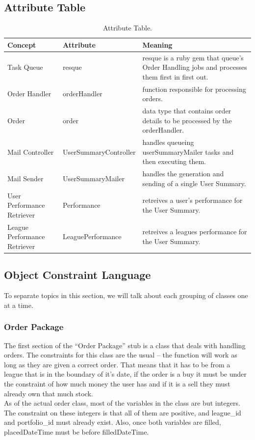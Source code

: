 \begin{table}
\subsection{Attribute Table}
\begin{tabular}{|p{1.5in}|p{1.5in}|p{3in}|}
\hline
Concept & Attribute & Meaning\\
\hline
Task Queue & resque & resque is a ruby gem that queue's Order Handling jobs and processes them first in first out.\\
\hline
Order Handler & orderHandler & function responsible for processing orders.\\
\hline
Order & order & data type that contains order details to be processed by the orderHandler.\\
\hline
Mail Controller & UserSummaryController & handles queueing userSummaryMailer tasks and then executing them.\\
\hline
Mail Sender & UserSummaryMailer & handles the generation and sending of a single User Summary.\\
\hline
User Performance Retriever & Performance & retreives a user's performance for the User Summary.\\
\hline
League Performance Retriever & LeaguePerformance & retreives a leagues performance for the User Summary.\\
\hline
\end{tabular}
\caption{ Attribute Table.}
\end{table}
\subsection{Object Constraint Language}
To separate topics in this section, we will talk about each grouping of classes one at a time. 
\subsubsection{Order Package}
The first section of the ``Order Package'' stub is a class that deals with handling orders. The constraints for this class are the usual -- the function will work as long as they are given a correct order. That means that it has to be from a league that is in the boundary of it's date, if the order is a buy it must be under the constraint of how much money the user has and if it is a sell they must already own that much stock.\\
As of the actual order class, most of the variables in the class are but integers. The constraint on these integers is that all of them are positive, and league\_id and portfolio\_id must already exist. Also, once both variables are filled, placedDateTime must be before filledDateTime.
